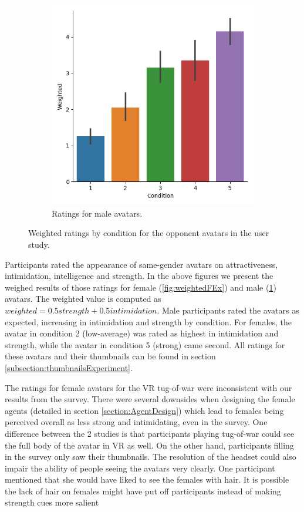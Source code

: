 \begin{figure}[H]
\begin{subfigure}[b]{0.4\textwidth}
         \includegraphics[width=\textwidth]{Files/Plots/weighted_ratings_male_experiment.png}
         \caption{Ratings for male avatars.}
         \label{fig:weightedMEx}
     \end{subfigure}
      \hspace*{\fill}
     \caption{Weighted ratings by condition for the opponent avatars in the user study.}
         \label{fig:weightedEX}
\end{figure} 
Participants rated the appearance of same-gender avatars on attractiveness, intimidation, intelligence and strength. In the above  figures we present the weighed results of those ratings for female (\ref{fig:weightedFEx}) and male (\ref{fig:weightedMEx}) avatars. The weighted value is computed as $weighted=0.5strength+0.5intimidation$.
Male participants rated the avatars as expected, increasing in intimidation and strength by condition. For females, the avatar in condition 2 (low-average) was rated as highest in intimidation and strength, while the avatar in condition 5 (strong) came second. All ratings for these avatars and their thumbnails can be found in section \ref{subsection:thumbnailsExperiment}. 


The ratings for female avatars for the VR tug-of-war were inconsistent with our results from the survey. There were several downsides when designing the female agents (detailed in section \ref{section:AgentDesign}) which lead to females being perceived overall as less strong and intimidating, even in the survey. One difference between the 2 studies is that participants playing tug-of-war could see the full body of the avatar in VR as well. On the other hand, participants filling in the survey only saw their thumbnails. The resolution of the headset could also impair the ability of people seeing the avatars very clearly. One participant mentioned that she would have liked to see the females with hair. It is possible the lack of hair on females might have put off participants instead of making strength cues more salient

